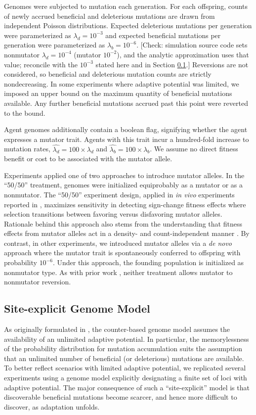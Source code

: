 Genomes were subjected to mutation each generation.
For each offspring, counts of newly accrued beneficial and deleterious mutations are drawn from independent Poisson distributions.
Expected deleterious mutations per generation were parameterized as
$\lambda_d=10^{-3}$ and expected beneficial mutations per generation were parameterized as $\lambda_b=10^{-6}$.
[Check: simulation source code sets nonmutator $\lambda_d = 10^{-4}$ (mutator $10^{-2}$), and the analytic approximation uses that value; reconcile with the $10^{-3}$ stated here and in Section \ref{sec:site-explicit}.]
Reversions are not considered, so beneficial and deleterious mutation counts are strictly nondecreasing.
In some experiments where adaptive potential was limited, we imposed an upper bound on the maximum quantity of beneficial mutations available.
Any further beneficial mutations accrued past this point were reverted to the bound.

Agent genomes additionally contain a boolean flag, signifying whether the agent expresses a mutator trait.
Agents with this trait incur a hundred-fold increase to mutation rates, $\hat{\lambda_d} = 100 \times \lambda_d$ and $\hat{\lambda_b} = 100 \times \lambda_b$.
We assume no direct fitness benefit or cost to be associated with the mutator allele.

Experiments applied one of two approaches to introduce mutator alleles.
In the ``50/50'' treatment, genomes were initialized equiprobably as a mutator or as a nonmutator.
The ``50/50'' experiment design, applied in \textit{in vivo} experiments reported in \citet{raynes2018sign}, maximizes sensitivity in detecting sign-change fitness effects where selection transitions between favoring versus disfavoring mutator alleles.
Rationale behind this approach also stems from the understanding that fitness effects from mutator alleles act in a density- and count-independent manner \citep{raynes2019selection}.
By contrast, in other experiments, we introduced mutator alleles via a \textit{de novo} approach where the mutator trait is spontaneously conferred to offspring with probability $10^{-6}$.
Under this approach, the founding population is initialized as nonmutator type.
As with prior work \citep{raynes2018sign}, neither treatment allows mutator to nonmutator reversion.

\subsection{Site-explicit Genome Model} \label{sec:site-explicit}
As originally formulated in \citet{raynes2018sign}, the counter-based genome model assumes the availability of an unlimited adaptive potential.
In particular, the memorylessness of the probability distribution for mutation accumulation suits the assumption that an unlimited number of beneficial (or deleterious) mutations are available.
To better reflect scenarios with limited adaptive potential, we replicated several experiments using a genome model explicitly designating a finite set of loci with adaptive potential.
The major consequence of such a ``site-explicit'' model is that discoverable beneficial mutations become scarcer, and hence more difficult to discover, as adaptation unfolds.

